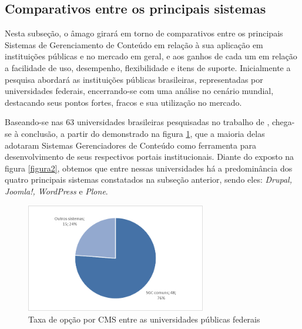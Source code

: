 \hspace{2.5cm}

\subsection{Comparativos entre os principais sistemas}
\label{subsec:comparacao}

\hspace{2.5cm}


Nesta subseção, o âmago girará em torno de comparativos entre os principais Sistemas de Gerenciamento de Conteúdo em relação à sua aplicação em instituições públicas e no mercado em geral, e aos ganhos de cada um em relação a facilidade de uso, desempenho, flexibilidade e itens de suporte. Inicialmente a pesquisa abordará as instituições públicas brasileiras, representadas por universidades federais, encerrando-se com uma análise no cenário mundial, destacando seus pontos fortes, fracos e sua utilização no mercado. 

Baseando-se nas 63 universidades brasileiras pesquisadas no trabalho de , chega-se à conclusão, a partir do demonstrado na figura \ref{figura1}, que a maioria delas adotaram Sistemas Gerenciadores de Conteúdo como ferramenta para desenvolvimento de seus respectivos portais institucionais. Diante do exposto na figura \ref{figura2}, obtemos que entre nessas universidades há a predominância dos quatro principais sistemas constatados na subseção anterior, sendo eles: \textit{Drupal, Joomla!, WordPress} e \textit{Plone}.

\begin{figure}[htb]
 \centering
 \caption{Taxa de opção por CMS entre as universidades públicas federais}
 \includegraphics[width=0.7\textwidth]{figuras/adocao-de-cms}
 
 \label{figura1}
\end{figure}

